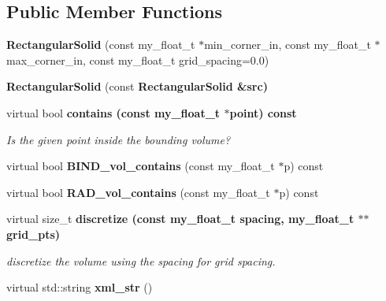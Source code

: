 \subsection*{Public Member Functions}
\begin{CompactItemize}
\item 
\textbf{Rectangular\-Solid} (const my\_\-float\_\-t $\ast$min\_\-corner\_\-in, const my\_\-float\_\-t $\ast$max\_\-corner\_\-in, const my\_\-float\_\-t grid\_\-spacing=0.0)\label{classSimSite3D_1_1RectangularSolid_6f27151311ea6c7c3036f033e55ce5bb}

\item 
\textbf{Rectangular\-Solid} (const \bf{Rectangular\-Solid} \&src)\label{classSimSite3D_1_1RectangularSolid_52a293bc179ad6858cf4c7f06937a224}

\item 
virtual bool \bf{contains} (const my\_\-float\_\-t $\ast$point) const \label{classSimSite3D_1_1RectangularSolid_a9e2c2a9ec3c034f3bba17219a7116c2}

\begin{CompactList}\small\item\em Is the given point inside the bounding volume? \item\end{CompactList}\item 
virtual bool \textbf{BIND\_\-vol\_\-contains} (const my\_\-float\_\-t $\ast$p) const \label{classSimSite3D_1_1RectangularSolid_3d17933ceada4081756d2e3f4a8bf6d2}

\item 
virtual bool \textbf{RAD\_\-vol\_\-contains} (const my\_\-float\_\-t $\ast$p) const \label{classSimSite3D_1_1RectangularSolid_888d6eb616e675241d0a3d11fb330a4f}

\item 
virtual size\_\-t \bf{discretize} (const my\_\-float\_\-t spacing, my\_\-float\_\-t $\ast$$\ast$grid\_\-pts)\label{classSimSite3D_1_1RectangularSolid_39443291990068ad369c9edfc75a4e76}

\begin{CompactList}\small\item\em discretize the volume using the spacing for grid spacing. \item\end{CompactList}\item 
virtual std::string \textbf{xml\_\-str} ()\label{classSimSite3D_1_1RectangularSolid_a8acf31a229ca25907a0d6cb85da4ec3}

\end{CompactItemize}
